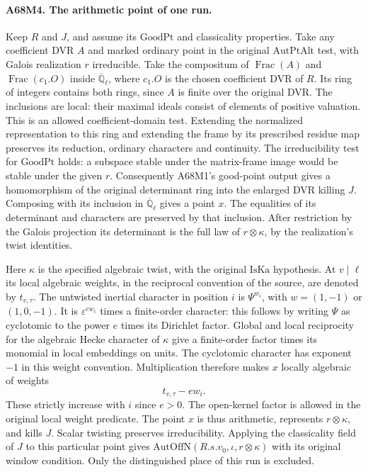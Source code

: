 \paragraph{A68M4. The arithmetic point of one run.}
Keep $R$ and $J$, and assume its $\mathrm{GoodPt}$ and classicality
properties. Take any coefficient DVR $A$ and marked ordinary point
in the original $\mathrm{AutPtAlt}$ test, with Galois realization
$r$ irreducible. Take the compositum of $\operatorname{Frac}(A)$ and
$\operatorname{Frac}(c_1.O)$ inside $\overline{\mathbb Q}_\ell$,
where $c_1.O$ is the chosen coefficient DVR of $R$. Its ring of integers contains both
rings, since $A$ is finite over the original DVR. The inclusions
are local: their maximal ideals consist of elements of positive
valuation. This is an allowed coefficient-domain test. Extending
the normalized representation to this ring and extending the
frame by its prescribed residue map preserves its reduction,
ordinary characters and continuity. The irreducibility test for
$\mathrm{GoodPt}$ holds: a subspace stable under the matrix-frame
image would be stable under the given $r$. Consequently A68M1's
good-point output gives a homomorphism of the original determinant
ring into the enlarged DVR killing $J$. Composing with its inclusion
in $\overline{\mathbb Q}_\ell$ gives a point $x$. The equalities
of its determinant and characters are preserved by that inclusion.
After restriction by the Galois projection its determinant is the
full law of $r\otimes\kappa$, by the realization's twist identities.

Here $\kappa$ is the specified algebraic twist, with the original
$\mathrm{IsKa}$ hypothesis. At $v\mid\ell$ its local algebraic
weights, in the reciprocal convention of the source, are denoted by
$t_{v,\tau}$. The untwisted inertial character in position $i$ is
$\Psi^{w_i}$, with $w=(1,-1)$ or $(1,0,-1)$. It is
$\varepsilon^{e w_i}$ times a finite-order character: this follows
by writing $\Psi$ as cyclotomic to the power $e$ times its
Dirichlet factor. Global and local reciprocity for the algebraic
Hecke character of $\kappa$ give a finite-order factor times its
monomial in local embeddings on units. The cyclotomic character
has exponent $-1$ in this weight convention. Multiplication
therefore makes $x$ locally algebraic of weights
\[
                         t_{v,\tau}-e w_i .
\]
These strictly increase with $i$ since $e>0$. The open-kernel
factor is allowed in the original local weight predicate. The point
$x$ is thus arithmetic, represents $r\otimes\kappa$, and kills
$J$. Scalar twisting preserves irreducibility. Applying the
classicality field of $J$ to this particular point gives
$\mathrm{AutOffN}(R.s.v_0,\iota,r\otimes\kappa)$ with its original
window condition. Only the distinguished place of this run is excluded.

